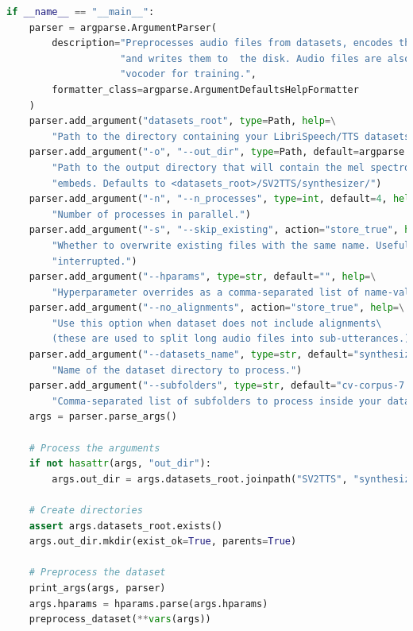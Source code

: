\begin{enumerate}
\begin{lstlisting}[language=Python, caption=Training Speaker Encoder Model (Pycharm)]
if __name__ == "__main__":
    parser = argparse.ArgumentParser(
        description="Preprocesses audio files from datasets, encodes them as mel spectrograms "
                    "and writes them to  the disk. Audio files are also saved, to be used by the "
                    "vocoder for training.",
        formatter_class=argparse.ArgumentDefaultsHelpFormatter
    )
    parser.add_argument("datasets_root", type=Path, help=\
        "Path to the directory containing your LibriSpeech/TTS datasets.")
    parser.add_argument("-o", "--out_dir", type=Path, default=argparse.SUPPRESS, help=\
        "Path to the output directory that will contain the mel spectrograms, the audios and the "
        "embeds. Defaults to <datasets_root>/SV2TTS/synthesizer/")
    parser.add_argument("-n", "--n_processes", type=int, default=4, help=\
        "Number of processes in parallel.")
    parser.add_argument("-s", "--skip_existing", action="store_true", help=\
        "Whether to overwrite existing files with the same name. Useful if the preprocessing was "
        "interrupted.")
    parser.add_argument("--hparams", type=str, default="", help=\
        "Hyperparameter overrides as a comma-separated list of name-value pairs")
    parser.add_argument("--no_alignments", action="store_true", help=\
        "Use this option when dataset does not include alignments\
        (these are used to split long audio files into sub-utterances.)")
    parser.add_argument("--datasets_name", type=str, default="synthesizer_dataset", help=\
        "Name of the dataset directory to process.")
    parser.add_argument("--subfolders", type=str, default="cv-corpus-7.0-2021-07-21", help=\
        "Comma-separated list of subfolders to process inside your dataset directory")
    args = parser.parse_args()

    # Process the arguments
    if not hasattr(args, "out_dir"):
        args.out_dir = args.datasets_root.joinpath("SV2TTS", "synthesizer")

    # Create directories
    assert args.datasets_root.exists()
    args.out_dir.mkdir(exist_ok=True, parents=True)

    # Preprocess the dataset
    print_args(args, parser)
    args.hparams = hparams.parse(args.hparams)
    preprocess_dataset(**vars(args))
    
\end{lstlisting}


\end{enumerate}
